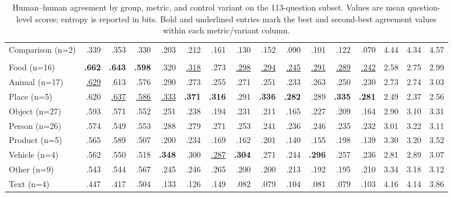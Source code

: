 \begin{table}[h]
{\begin{tabular}{lrrrrrrrrrrrrrrr}
Comparison (n=2)  & .339 & .353 & .330 & .203 & .212 & .161 & .130 & .152 & .090 & .101 & .122 & .070 & 4.44 & 4.34 & 4.57 \\
\addlinespace[4pt]
\midrule
\multicolumn{16}{l}{\textit{By entity type}} \\
\midrule
Food (n=16)  & \textbf{.662} & \textbf{.643} & \textbf{.598} & .320 & \underline{.318} & .273 & \underline{.298} & \underline{.294} & \underline{.245} & \underline{.291} & \underline{.289} & \underline{.242} & 2.58 & 2.75 & 2.99 \\
Animal (n=17)  & \underline{.629} & .613 & .576 & .290 & .273 & .255 & .271 & .251 & .233 & .263 & .250 & .230 & 2.73 & 2.74 & 3.03 \\
Place (n=5)  & .620 & \underline{.637} & \underline{.586} & \underline{.333} & \textbf{.371} & \textbf{.316} & .291 & \textbf{.336} & \textbf{.282} & .289 & \textbf{.335} & \textbf{.281} & 2.49 & 2.37 & 2.56 \\
Object (n=27)  & .593 & .571 & .552 & .251 & .238 & .194 & .231 & .211 & .165 & .227 & .209 & .164 & 2.90 & 3.10 & 3.31 \\
Person (n=26)  & .574 & .549 & .553 & .288 & .279 & .271 & .253 & .241 & .236 & .246 & .235 & .232 & 3.01 & 3.22 & 3.11 \\
Product (n=5)  & .565 & .589 & .507 & .200 & .234 & .169 & .162 & .201 & .140 & .155 & .198 & .139 & 3.30 & 3.20 & 3.52 \\
Vehicle (n=4)  & .562 & .550 & .518 & \textbf{.348} & .300 & \underline{.287} & \textbf{.304} & .271 & .244 & \textbf{.296} & .257 & .236 & 2.81 & 2.89 & 3.07 \\
Other (n=9)  & .543 & .544 & .567 & .245 & .246 & .265 & .200 & .200 & .213 & .192 & .195 & .210 & 3.34 & 3.18 & 3.12 \\
Text (n=4)  & .447 & .417 & .504 & .133 & .126 & .149 & .082 & .079 & .104 & .081 & .079 & .103 & 4.16 & 4.14 & 3.86 \\
\bottomrule
\end{tabular}
\caption{Human--human agreement by group, metric, and control variant on the 113-question subset. Values are mean question-level scores; entropy is reported in bits. Bold and underlined entries mark the best and second-best agreement values within each metric/variant column.}
\label{tab:hh_metric_robustness}
}%
\end{table}
